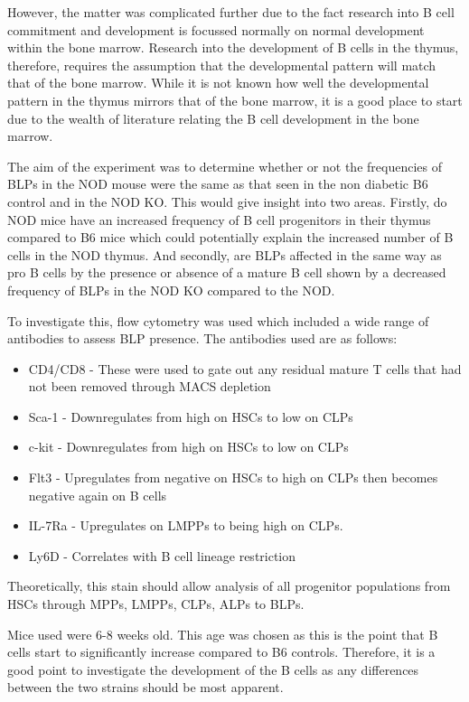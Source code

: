 However, the matter was complicated further due to the fact research into B cell commitment and development is focussed normally on normal development within the bone marrow.
Research into the development of B cells in the thymus, therefore, requires the assumption that the developmental pattern will match that of the bone marrow.
While it is not known how well the developmental pattern in the thymus mirrors that of the bone marrow, it is a good place to start due to the wealth of literature relating the B cell development in the bone marrow.

The aim of the experiment was to determine whether or not the frequencies of BLPs in the NOD mouse were the same as that seen in the non diabetic B6 control and in the NOD KO.
This would give insight into two areas.
Firstly, do NOD mice have an increased frequency of B cell progenitors in their thymus compared to B6 mice which could potentially explain the increased number of B cells in the NOD thymus.
And secondly, are BLPs affected in the same way as pro B cells by the presence or absence of a mature B cell shown by a decreased frequency of BLPs in the NOD KO compared to the NOD.

To investigate this, flow cytometry was used which included a wide range of antibodies to assess BLP presence.
The antibodies used are as follows:
\begin{itemize}
\item CD4/CD8 - These were used to gate out any residual mature T cells that had not been removed through MACS depletion
\item Sca-1 - Downregulates from high on HSCs to low on CLPs
\item c-kit - Downregulates from high on HSCs to low on CLPs
\item Flt3 - Upregulates from negative on HSCs to high on CLPs then becomes negative again on B cells \citep{Holmes2006}
\item IL-7Ra - Upregulates on LMPPs to being high on CLPs.
\item Ly6D - Correlates with B cell lineage restriction \citep{Inlay2009}
\end{itemize}

Theoretically, this stain should allow analysis of all progenitor populations from HSCs through MPPs, LMPPs, CLPs, ALPs to BLPs.

Mice used were 6-8 weeks old.
This age was chosen as this is the point that B cells start to significantly increase compared to B6 controls.
Therefore, it is a good point to investigate the development of the B cells as any differences between the two strains should be most apparent.



